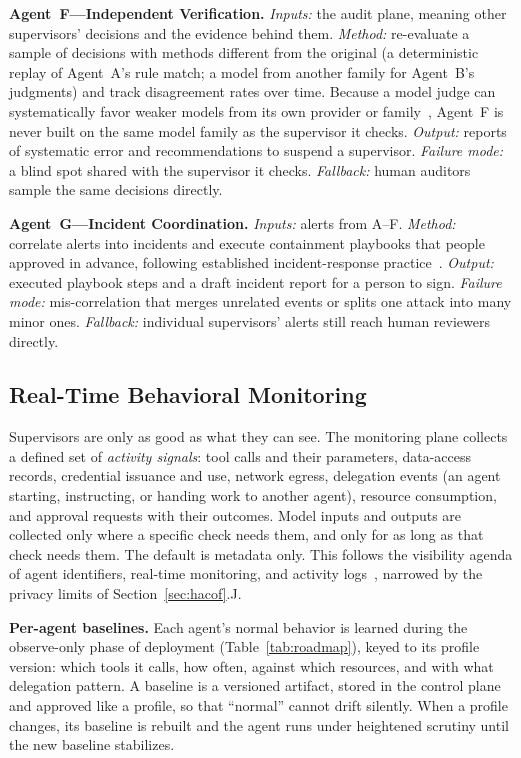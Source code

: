 \documentclass{ieeeaccess}
\begin{document}
\textbf{Agent~F---Independent Verification.} \textit{Inputs:} the audit plane, meaning other supervisors' decisions and the evidence behind them. \textit{Method:} re-evaluate a sample of decisions with methods different from the original (a deterministic replay of Agent~A's rule match; a model from another family for Agent~B's judgments) and track disagreement rates over time. Because a model judge can systematically favor weaker models from its own provider or family~\cite{kim2025correlated},
Agent~F is never built on the same model family as the supervisor it checks. \textit{Output:} reports of systematic error and recommendations to suspend a supervisor. \textit{Failure mode:} a blind spot shared with the supervisor it checks. \textit{Fallback:} human auditors sample the same decisions directly.

\textbf{Agent~G---Incident Coordination.} \textit{Inputs:} alerts from A--F. \textit{Method:} correlate alerts into incidents and execute containment playbooks that people approved in advance, following established incident-response practice~\cite{nist2025incident}.
\textit{Output:} executed playbook steps and a draft incident report for a person to sign. \textit{Failure mode:} mis-correlation that merges unrelated events or splits one attack into many minor ones. \textit{Fallback:} individual supervisors' alerts still reach human reviewers directly.

\subsection{Real-Time Behavioral Monitoring}
\label{sec:hacof-monitoring}

Supervisors are only as good as what they can see. The monitoring plane collects a defined set of \textit{activity signals}: tool calls and their parameters, data-access records, credential issuance and use, network egress, delegation events (an agent starting, instructing, or handing work to another agent), resource consumption, and approval requests with their outcomes. Model inputs and outputs are collected only where a specific check needs them, and only for as long as that check needs them. The default is metadata only. This follows the visibility agenda of agent identifiers, real-time monitoring, and activity logs~\cite{chan2024visibility},
narrowed by the privacy limits of Section~\ref{sec:hacof}.J.

\textbf{Per-agent baselines.} Each agent's normal behavior is learned during the observe-only phase of deployment (Table~\ref{tab:roadmap}), keyed to its profile version: which tools it calls, how often, against which resources, and with what delegation pattern. A baseline is a versioned artifact, stored in the control plane and approved like a profile, so that ``normal'' cannot drift silently. When a profile changes, its baseline is rebuilt and the agent runs under heightened scrutiny until the new baseline stabilizes.
\end{document}

